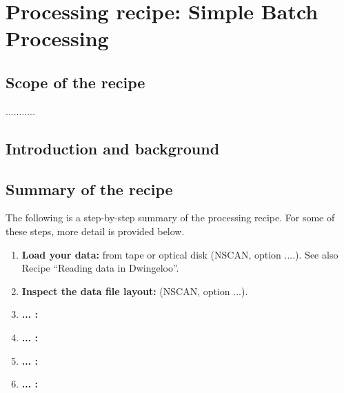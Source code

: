 %
%
\chapter{Processing recipe: Simple Batch Processing}
\tableofcontents 

\section{Scope of the recipe}
\label{.scope}

...........




\section{Introduction and background}
\label{.intro}


\section{Summary of the recipe}
\label{.summary}

The following is a step-by-step summary of the processing recipe.
For some of these steps, more detail is provided below.

\begin{enumerate}
\item {\bf Load your data:} 
from tape or optical disk (NSCAN, option ....).
See also Recipe ``Reading data in Dwingeloo''.
\item {\bf Inspect the data file layout:} (NSCAN, option ...).
\item {\bf ... :}
\item {\bf ... :}
\item {\bf ... :}
\item {\bf ... :}
\end{enumerate}



